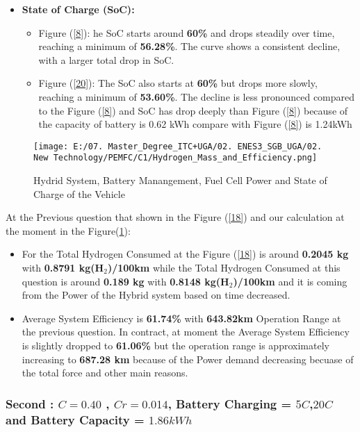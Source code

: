 \documentclass[12pt,a4paper]{article}
\numberwithin{equation}{section}
\begin{document}
\begin{itemize}
	\item \textbf{State of Charge (SoC):}
	\begin{itemize}
		\item {Figure (\ref{8}):} he SoC starts around \textbf{60\%} and drops steadily over time, reaching a minimum of \textbf{56.28\%}. The curve shows a consistent decline, with a larger total drop in SoC.
		\item {Figure (\ref{20}):} The SoC also starts at \textbf{60\%} but drops more slowly, reaching a minimum of \textbf{53.60\%}. The decline is less pronounced compared to the Figure (\ref{8}) and SoC has drop deeply than Figure (\ref{8}) because of the capacity of battery is 0.62 kWh compare with Figure (\ref{8}) is 1.24kWh
	\end{itemize}

	
\end{itemize}

\begin{figure}[h]
	\centering 
	\texttt{[image: E:/07. Master\_Degree\_ITC+UGA/02. ENES3\_SGB\_UGA/02. New Technology/PEMFC/C1/Hydrogen\_Mass\_and\_Efficiency.png]}
	\caption{\small {Hydrid System, Battery Manangement, Fuel Cell Power and State of Charge of the Vehicle}}
	\label{21}
\end{figure}

At the Previous question that shown in the Figure (\ref{18}) and our calculation at the moment in the Figure(\ref{21}):

\begin{itemize}
	\item For the Total Hydrogen Consumed at the Figure (\ref{18}) is around \textbf{0.2045 kg} with \textbf{0.8791 kg(H$_2$)/100km} while the Total Hydrogen Consumed at this question is around \textbf{0.189 kg} with \textbf{0.8148 kg(H$_2$)/100km} and it is coming from the Power of the Hybrid system based on time decreased.
	
	\item Average System Efficiency is \textbf{61.74\%} with \textbf{643.82km} Operation Range at the previous question. In contract, at moment the Average System Efficiency is slightly dropped to \textbf{61.06\%} but the operation range is approximately increasing to \textbf{687.28 km} because of the Power demand decreasing becuase of the total force and other main reasons.
	
\end{itemize} 

\subsubsection{Second : $C = 0.40$ , $Cr = 0.014$, Battery Charging = $5C$,$20C$ and Battery Capacity = $1.86 kWh$}
\end{document}
